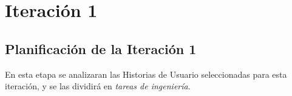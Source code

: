 \section{Iteración 1}
\label{sec:iteracion_1}


%

\subsection{Planificación de la Iteración 1}

En esta etapa se analizaran las Historias de Usuario seleccionadas para esta iteración, y se las dividirá en \emph{tareas de ingeniería}. \\



%
%

